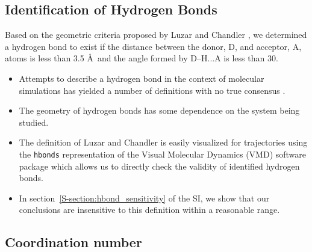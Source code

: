 \documentclass{article}
\begin{document}
  \subsection*{Identification of Hydrogen Bonds}\label{method:hbonds}

  Based on the geometric criteria proposed by Luzar and Chandler \cite{luzar_effect_1996},
  we determined a hydrogen bond to exist if the distance between the donor, D, and acceptor,
  A, atoms is less than 3.5 \AA~and the angle formed by D--H...A is less than 30\degree.
  \begin{itemize}
    \item Attempts to describe a hydrogen bond in the context of molecular simulations has
    yielded a number of definitions with no true consensus \cite{prada-gracia_quest_2013}.
	\item The geometry of hydrogen bonds has some dependence on the system being studied. 
    \item The definition of Luzar and Chandler is easily visualized for trajectories using
    the \texttt{hbonds} representation of the Visual Molecular Dynamics (VMD) software 
    package which allows us to directly check the validity of identified hydrogen bonds.
    \item In section~\ref{S-section:hbond_sensitivity} of the SI, we show that our 
    conclusions are insensitive to this definition within a reasonable range.
  \end{itemize}

  \subsection*{Coordination number}\label{method:coordination}
\end{document}
